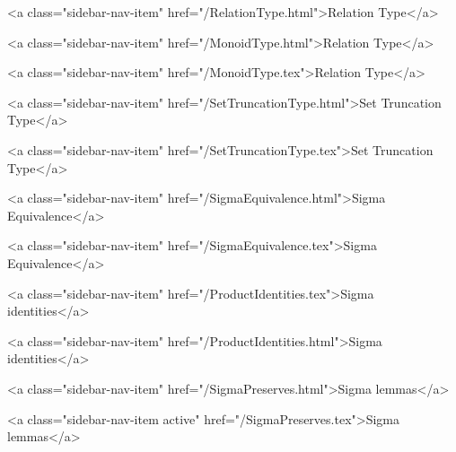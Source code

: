       
    
      
        
          <a class="sidebar-nav-item" href="/RelationType.html">Relation Type</a>
        
      
    
      
        
          <a class="sidebar-nav-item" href="/MonoidType.html">Relation Type</a>
        
      
    
      
        
          <a class="sidebar-nav-item" href="/MonoidType.tex">Relation Type</a>
        
      
    
      
        
          <a class="sidebar-nav-item" href="/SetTruncationType.html">Set Truncation Type</a>
        
      
    
      
        
          <a class="sidebar-nav-item" href="/SetTruncationType.tex">Set Truncation Type</a>
        
      
    
      
        
          <a class="sidebar-nav-item" href="/SigmaEquivalence.html">Sigma Equivalence</a>
        
      
    
      
        
          <a class="sidebar-nav-item" href="/SigmaEquivalence.tex">Sigma Equivalence</a>
        
      
    
      
        
          <a class="sidebar-nav-item" href="/ProductIdentities.tex">Sigma identities</a>
        
      
    
      
        
          <a class="sidebar-nav-item" href="/ProductIdentities.html">Sigma identities</a>
        
      
    
      
        
          <a class="sidebar-nav-item" href="/SigmaPreserves.html">Sigma lemmas</a>
        
      
    
      
        
          <a class="sidebar-nav-item active" href="/SigmaPreserves.tex">Sigma lemmas</a>
        
